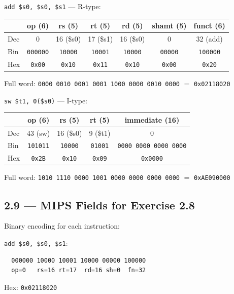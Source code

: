 \texttt{add \$s0, \$s0, \$s1} --- R-type:
\begin{center}
\small
\begin{tabular}{lcccccc}
\toprule
& op (6) & rs (5) & rt (5) & rd (5) & shamt (5) & funct (6) \\
\midrule
Dec & 0 & 16 (\$s0) & 17 (\$s1) & 16 (\$s0) & 0 & 32 (add) \\
Bin & \texttt{000000} & \texttt{10000} & \texttt{10001}
    & \texttt{10000} & \texttt{00000} & \texttt{100000} \\
Hex & \texttt{0x00} & \texttt{0x10} & \texttt{0x11}
    & \texttt{0x10} & \texttt{0x00} & \texttt{0x20} \\
\bottomrule
\end{tabular}
\end{center}
Full word: \texttt{0000\,0010\,0001\,0001\,1000\,0000\,0010\,0000}
$=$ \texttt{0x02118020}

\bigskip
\texttt{sw \$t1, 0(\$s0)} --- I-type:
\begin{center}
\small
\begin{tabular}{lcccc}
\toprule
& op (6) & rs (5) & rt (5) & immediate (16) \\
\midrule
Dec & 43 (sw) & 16 (\$s0) & 9 (\$t1) & 0 \\
Bin & \texttt{101011} & \texttt{10000} & \texttt{01001}
    & \texttt{0000\,0000\,0000\,0000} \\
Hex & \texttt{0x2B} & \texttt{0x10} & \texttt{0x09}
    & \texttt{0x0000} \\
\bottomrule
\end{tabular}
\end{center}
Full word: \texttt{1010\,1110\,0000\,1001\,0000\,0000\,0000\,0000}
$=$ \texttt{0xAE090000}

\subsection*{2.9 --- MIPS Fields for Exercise 2.8}
\hypertarget{sol-2.9}{}

Binary encoding for each instruction:

\texttt{add \$s0, \$s0, \$s1}:
\begin{verbatim}
  000000 10000 10001 10000 00000 100000
  op=0   rs=16 rt=17  rd=16 sh=0  fn=32
\end{verbatim}
Hex: \texttt{0x02118020}

